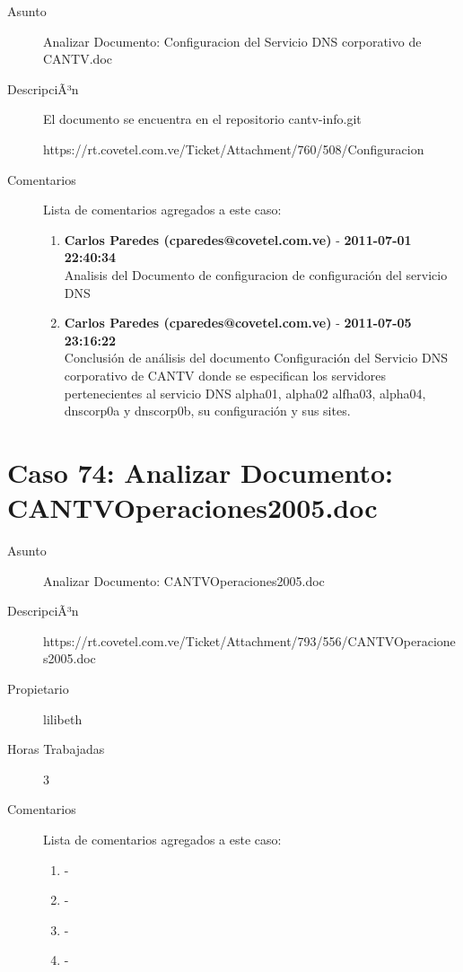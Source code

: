 \begin{description}

\item[Asunto] Analizar Documento: Configuracion del Servicio DNS corporativo de CANTV.doc\item[DescripciÃ³n] El documento se encuentra en el repositorio cantv-info.git

https://rt.covetel.com.ve/Ticket/Attachment/760/508/Configuracion%

\item[Comentarios] Lista de comentarios agregados a este caso:  
\begin{enumerate}
        \item {\bfseries Carlos Paredes (cparedes@covetel.com.ve)  } - {\bfseries 2011-07-01 22:40:34} \\ Analisis del Documento de configuracion de configuración del servicio DNS        \item {\bfseries Carlos Paredes (cparedes@covetel.com.ve)  } - {\bfseries 2011-07-05 23:16:22} \\ Conclusión de análisis del documento Configuración del Servicio DNS corporativo
de CANTV donde se especifican los servidores pertenecientes al servicio DNS
alpha01, alpha02 alfha03, alpha04, dnscorp0a y dnscorp0b, su configuración y
sus sites.    \end{enumerate}

\end{description}

\section{Caso 74: Analizar Documento: CANTVOperaciones2005.doc }

\begin{description}

\item[Asunto] Analizar Documento: CANTVOperaciones2005.doc\item[DescripciÃ³n] https://rt.covetel.com.ve/Ticket/Attachment/793/556/CANTVOperaciones2005.doc\item[Propietario] lilibeth\item[Horas Trabajadas] 3

\item[Comentarios] Lista de comentarios agregados a este caso:  
\begin{enumerate}
        \item {\bfseries  } - {\bfseries } \\         \item {\bfseries  } - {\bfseries } \\         \item {\bfseries  } - {\bfseries } \\         \item {\bfseries  } - {\bfseries } \\     \end{enumerate}

\end{description}

